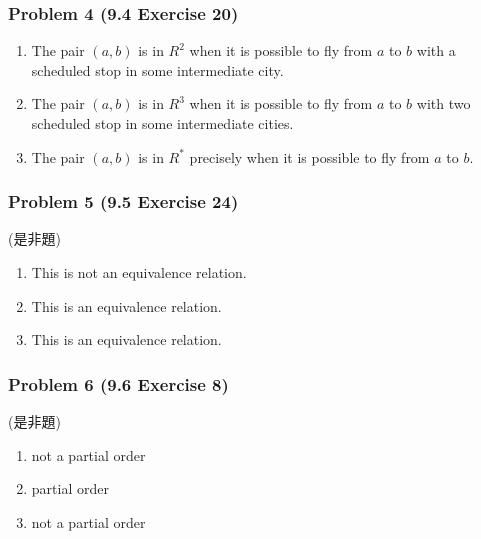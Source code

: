 \documentclass[12pt,hyperref={bookmarks=false}]{beamer}
\begin{document}
	\begin{frame}
	\frametitle{Problem 4 (9.4 Exercise 20)}
	\fontsize{10}{10pt}\selectfont
	\begin{enumerate}[label=(\alph*)]
	\setlength\itemsep{1em}
	\item The pair $(a, b)$ is in $R^2$ when it is possible to fly from $a$ to $b$ with a scheduled stop in some intermediate city.
	\item The pair $(a, b)$ is in $R^3$ when it is possible to fly from $a$ to $b$ with two scheduled stop in some intermediate cities.
	\item The pair $(a, b)$ is in $R^*$ precisely when it is possible to fly from $a$ to $b$.
	\end{enumerate}
	\end{frame}
	
	\begin{frame}
	\frametitle{Problem 5 (9.5 Exercise 24)}
	\fontsize{10}{10pt}\selectfont
	(是非題)
	\vspace*{0.3cm}
	\begin{enumerate}[label=(\alph*)]
	\setlength\itemsep{1em}
	\item This is not an equivalence relation.
	\item This is an equivalence relation.
	\item This is an equivalence relation.
	\end{enumerate}
	\end{frame}
	
	\begin{frame}
	\frametitle{Problem 6 (9.6 Exercise 8)}
	\fontsize{10}{10pt}\selectfont
	(是非題)
	\vspace*{0.3cm}
	\begin{enumerate}[label=(\alph*)]
	\setlength\itemsep{1em}
	\item not a partial order
	\item partial order
	\item not a partial order
	\end{enumerate}
	\end{frame}
	

		
\end{document}
